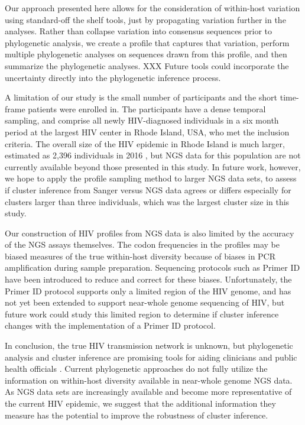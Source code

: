 \documentclass[letterpaper]{article}
\begin{document}
Our approach presented here allows for the consideration of within-host variation using standard-off the shelf tools, just by propagating variation further in the analyses. Rather than collapse variation into consensus sequences prior to phylogenetic analysis, we create a profile that captures that variation, perform multiple phylogenetic analyses on sequences drawn from this profile, and then summarize the phylogenetic analyses. XXX  Future tools could incorporate the uncertainty directly into the phylogenetic inference process.

A limitation of our study is the small number of participants and the short time-frame patients were enrolled in. The participants have a dense temporal sampling, and comprise all newly HIV-diagnosed individuals in a six month period at the largest HIV center in Rhode Island, USA, who met the inclusion criteria. The overall size of the HIV epidemic in Rhode Island is much larger, estimated as 2,396 individuals in 2016 \parencite{ridoh}, but NGS data for this population are not currently available beyond those presented in this study. In future work, however, we hope to apply the profile sampling method to larger NGS data sets, to assess if cluster inference from Sanger versus NGS data agrees or differs especially for clusters larger than three individuals, which was the largest cluster size in this study.

Our construction of HIV profiles from NGS data is also limited by the accuracy of the NGS assays themselves. The codon frequencies in the profiles may be biased measures of the true within-host diversity because of biases in PCR amplification during sample preparation. Sequencing protocols such as Primer ID \parencite{jabara} have been introduced to reduce and correct for these biases. Unfortunately, the Primer ID protocol supports only a limited region of the HIV genome, and has not yet been extended to support near-whole genome sequencing of HIV, but future work could study this limited region to determine if cluster inference changes with the implementation of a Primer ID protocol.

In conclusion, the true HIV transmission network is unknown, but phylogenetic analysis and cluster inference are promising tools for aiding clinicians and public health officials \parencite{fauci}. Current phylogenetic approaches do not fully utilize the information on within-host diversity available in near-whole genome NGS data. As NGS data sets are increasingly available and become more representative of the current HIV epidemic, we suggest that the additional information they measure has the potential to improve the robustness of cluster inference.
\end{document}
